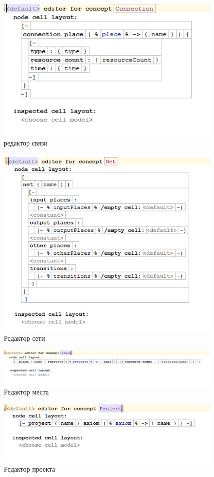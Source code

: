 \begin{figure}[ht]
	\centering
	\includegraphics[width=0.7\linewidth]{images/editor/Connection}
	\caption{редактор связи}
	\label{fig:connection}
\end{figure}

\begin{figure}[ht]
	\centering
	\includegraphics[width=0.7\linewidth]{images/editor/Net}
	\caption{Редактор сети}
	\label{fig:net}
\end{figure}

\begin{figure}[ht]
	\centering
	\includegraphics[width=0.7\linewidth]{images/editor/Place}
	\caption{Редактор места}
	\label{fig:place}
\end{figure}

\begin{figure}[ht]
	\centering
	\includegraphics[width=0.7\linewidth]{images/editor/Project}
	\caption{Редактор проекта}
	\label{fig:project}
\end{figure}
